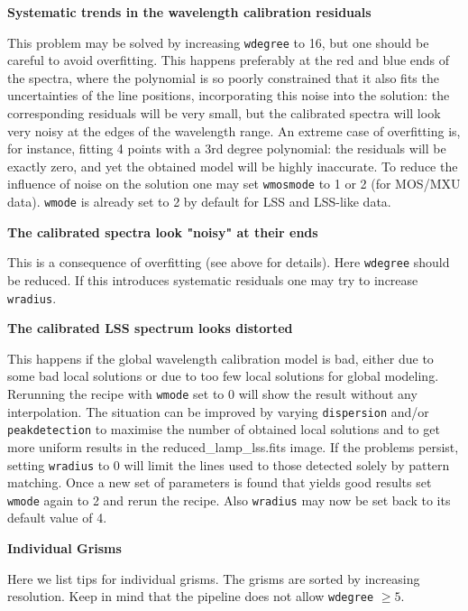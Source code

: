 {\bf Systematic trends in the wavelength calibration residuals}

This problem may be solved by increasing {\tt wdegree} to 16, but one should be careful to avoid overfitting. This happens preferably at the red and blue ends of the spectra, where the polynomial is so poorly constrained that
it also fits the uncertainties of the line positions, incorporating this noise into the solution: the corresponding
residuals will be very small, but the calibrated spectra will look very noisy at the edges of the wavelength range.
An extreme case of overfitting is, for instance, fitting 4 points with a 3rd degree polynomial: the residuals will
be exactly zero, and yet the obtained model will be highly inaccurate. To reduce the influence of noise on the
solution one may set {\tt wmosmode} to 1 or 2 (for MOS/MXU data). {\tt wmode} is already set to 2 by default for LSS and LSS-like data.

{\bf The calibrated spectra look "noisy" at their ends}

This is a consequence of overfitting (see above for details). Here {\tt wdegree} should be reduced. If this introduces systematic residuals one may try to increase {\tt wradius}.

{\bf The calibrated LSS spectrum looks distorted}

This happens if the global wavelength calibration model is bad, either due to some bad local solutions or due to
too few local solutions for global modeling. Rerunning the recipe with {\tt wmode} set to 0 will show the result without any interpolation. The situation can be improved by varying {\tt dispersion} and/or {\tt peakdetection} to
maximise the number of obtained local solutions and to get more uniform results in the reduced\_lamp\_lss.fits image. If the problems persist, setting {\tt wradius} to 0 will limit the lines used to those detected solely by pattern
matching. Once a new set of parameters is found that yields good results set {\tt wmode} again to 2 and rerun the recipe. Also {\tt wradius} may now be set back to its default value of 4.

{\bf Individual Grisms}

Here we list tips for individual grisms. The grisms are sorted by increasing resolution. Keep in mind that the pipeline does not allow {\tt wdegree} $\geq 5$.

